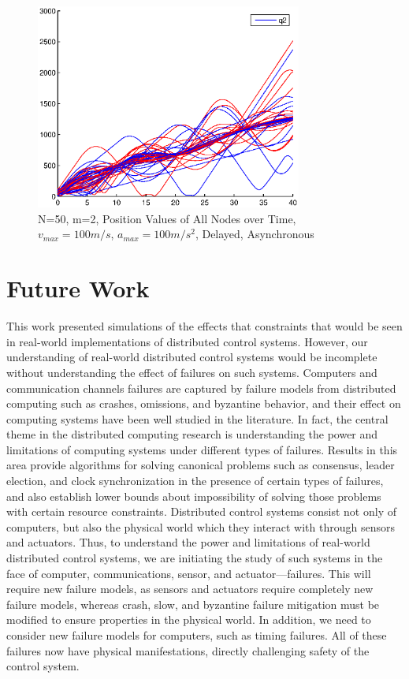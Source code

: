 \documentclass[10pt, conference]{IEEEtran}
\begin{document}
\begin{figure}[!h]
  \begin{center}
    \includegraphics[width=3.45in]{n50m2vmax100amax10000delayAsyncPosition}
  \end{center}

  \caption{\small N=50, m=2, Position Values of All Nodes over Time, $v_{max}=100m/s$, $a_{max}=100m/s^2$, Delayed, Asynchronous}
  \label{fig:n50m2vmax100amax10000delayAsyncPosition}
\end{figure}

\clearpage

\section{Future Work}
\label{sec:future}
This work presented simulations of the effects that constraints that would be seen in real-world implementations of distributed control systems.
%
However, our understanding of real-world distributed control systems would be incomplete without understanding the effect of failures on such systems.
%
Computers and communication channels failures are captured by failure models from distributed computing such as crashes, omissions, and byzantine behavior, and their effect on computing systems have been well studied in the literature. 
%
In fact, the central theme in the distributed computing research is understanding the power and limitations of computing systems under different types of failures. 
%
Results in this area provide algorithms for solving canonical problems such as consensus, leader election, and clock synchronization in the presence of certain types of failures, and also establish lower bounds about impossibility of solving those problems with certain resource constraints.
%
Distributed control systems consist not only of computers, but also the physical world which they interact with through sensors and actuators. 
%
Thus, to understand the power and limitations of real-world distributed control systems, we are initiating the study of such systems in the face of computer, communications, sensor, and actuator---failures. 
%
This will require new failure models, as sensors and actuators require completely new failure models, whereas crash, slow, and byzantine failure mitigation must be modified to ensure properties in the physical world.
%
In addition, we need to consider new failure models for computers, such as timing failures. 
%
All of these failures now have physical manifestations, directly challenging safety of the control system.
\end{document}

